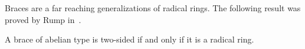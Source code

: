 

Braces are a far reaching generalizations of radical rings. The following result was proved by Rump in~\cite{MR2278047}.

\begin{theorem}
\label{thm:radical}
    A brace of abelian type is two-sided if and only if it is a radical ring. 
\end{theorem}

